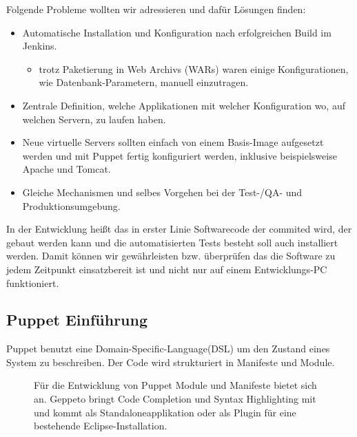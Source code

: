 \documentclass[12pt,a4paper,ngerman]{article}
\begin{document}
Folgende Probleme wollten wir adressieren und dafür Lösungen finden:
\begin{itemize}
\item Automatische Installation und Konfiguration nach erfolgreichen Build im Jenkins.
\begin{itemize}
\item trotz Paketierung in Web Archivs (WARs) waren einige Konfigurationen, wie Datenbank-Parametern, manuell einzutragen.
\end{itemize}
\item Zentrale Definition, welche Applikationen mit welcher Konfiguration wo, auf welchen Servern, zu laufen haben.
\item Neue virtuelle Servers sollten einfach von einem Basis-Image aufgesetzt werden und mit Puppet fertig konfiguriert werden, inklusive beispielsweise Apache und Tomcat.
\item Gleiche Mechanismen und selbes Vorgehen bei der Test-/QA- und Produktionsumgebung.
\end{itemize}

In der Entwicklung heißt das in erster Linie Softwarecode der commited wird, der gebaut werden kann und die automatisierten Tests besteht soll auch installiert werden. Damit können wir gewährleisten bzw. überprüfen das die Software zu jedem Zeitpunkt einsatzbereit ist und nicht nur auf einem Entwicklungs-PC funktioniert.

\subsection{Puppet Einführung}

Puppet benutzt eine Domain-Specific-Language(DSL) um den Zustand eines System zu beschreiben. Der Code wird strukturiert in Manifeste und Module.

\begin{figure}
\vspace{-20pt}
\begin{boxedminipage}{8cm}
Für die Entwicklung von Puppet Module und Manifeste bietet sich \cite{geppeto} an. Geppeto bringt Code Completion und Syntax Highlighting mit und kommt als Standaloneapplikation oder als Plugin für eine bestehende Eclipse-Installation. 
\end{boxedminipage}
\vspace{-20pt}
\end{figure}
\end{document}
